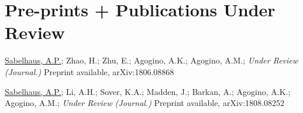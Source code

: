 \documentclass[letterpaper]{deedy-resume} %
\begin{document}
{%



  




\section{Pre-prints + Publications Under Review}

\vspace{0.2cm}

\begin{etaremune}
  
\item {} \underline{Sabelhaus, A.P.}; Zhao, H.; Zhu, E.; Agogino, A.K.; Agogino, A.M.; {\it Under Review (Journal.)} Preprint available, arXiv:1806.08868

\item {} \underline{Sabelhaus, A.P.}; Li, A.H.; Sover, K.A.; Madden, J.; Barkan, A.; Agogino, A.K.; Agogino, A.M.; {\it Under Review (Journal.)} Preprint available, arXiv:1808.08252


\end{etaremune}}
\end{document}
